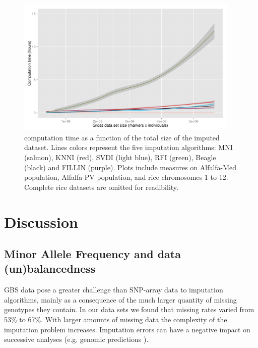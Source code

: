 \begin{figure}
\includegraphics[width=0.95\textwidth]{time_vs_size.pdf}
\caption[Computation times]{computation time as a function of the total size of the imputed dataset.
Lines colors represent the five imputation algorithms: MNI (salmon), KNNI (red), SVDI (light blue), RFI (green), Beagle (black) and FILLIN (purple).
Plots include measures on Alfalfa-Med population, Alfalfa-PV population, and rice chromosomes 1 to 12. Complete rice datasets are omitted for readibility.}
\label{fig:time_analysis}
\end{figure}
 
\makeatletter{}\section{Discussion}
\label{sec:discussion}

\subsection{Minor Allele Frequency and data (un)balancedness}
\label{sec:maf}
GBS data pose a greater challenge than SNP-array data to imputation algorithms, mainly as a consequence of the much larger quantity of missing genotypes they contain. In our data sets we found that missing rates varied from 53\% to 67\%. With larger amounts of missing data the complexity of the imputation problem increases. Imputation errors can have a negative impact on successive analyses (e.g. genomic predictions \cite{rutkoski_imputation_2013,Annicchiarico2015}).

